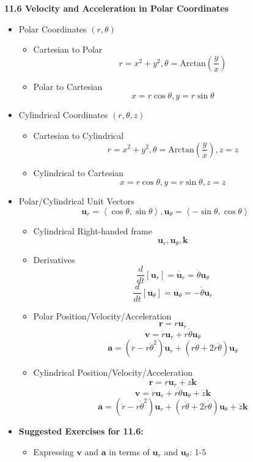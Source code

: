 \documentclass[12pt]{article}
\renewcommand{\vec}[1]{\mathbf{#1}}
\newcommand{\veck}{\mathbf{k}}
\newcommand{\<}{\left<}
\renewcommand{\>}{\right>}
\newcommand{\Arctan}{\text{Arctan}}
\begin{document}
  \newpage
  
  \centerline{\bf 11.6 Velocity and Acceleration in Polar Coordinates}
  
    \begin{itemize}
    
      \item Polar Coordinates $(r,\theta)$
        \begin{itemize}
          \item Cartesian to Polar
            \[r = x^2+y^2, \theta = \Arctan\left(\frac{y}{x}\right)\]
          \item Polar to Cartesian
            \[x = r\cos\theta, y=r\sin\theta\]
        \end{itemize}
        
      \item Cylindrical Coordinates $(r,\theta,z)$
        \begin{itemize}
          \item Cartesian to Cylindrical
            \[r = x^2+y^2, \theta = \Arctan\left(\frac{y}{x}\right), z=z\]
          \item Cylindrical to Cartesian
            \[x = r\cos\theta, y=r\sin\theta, z=z\]
        \end{itemize}
        
      \item Polar/Cylindrical Unit Vectors
        \[\vec{u}_r = \<\cos\theta,\sin\theta\>, \vec{u}_\theta = \<-\sin\theta,\cos\theta\>\]
        \begin{itemize}
          \item Cylindrical Right-handed frame
            \[\vec{u}_r,\vec{u}_\theta,\veck\]
          \item Derivatives
            \[\frac{d}{dt}\left[\vec{u}_r\right] = \dot{\vec{u}_r} = \dot{\theta}\vec{u}_\theta \]
            \[\frac{d}{dt}\left[\vec{u}_\theta\right] = \dot{\vec{u}_\theta} = -\dot{\theta}\vec{u}_r \]
          \item Polar Position/Velocity/Acceleration
            \[\vec{r} = r\vec{u}_r\]
            \[\vec{v} = \dot{r}\vec{u}_r + r\dot\theta\vec{u}_\theta\]
            \[\vec{a} = (\ddot{r} - r\dot\theta^2)\vec{u}_r + (r\ddot\theta + 2\dot{r}\dot\theta)\vec{u}_\theta\]
          \item Cylindrical Position/Velocity/Acceleration
            \[\vec{r} = r\vec{u}_r + z\veck\]
            \[\vec{v} = \dot{r}\vec{u}_r + r\dot\theta\vec{u}_\theta + \dot{z}\veck\]
            \[\vec{a} = (\ddot{r} - r\dot\theta^2)\vec{u}_r + (r\ddot\theta + 2\dot{r}\dot\theta)\vec{u}_\theta+\ddot{z}\veck\]
        \end{itemize}
      
      \item \textbf{ Suggested Exercises for 11.6:}
        \begin{itemize}
        \item Expressing $\vec{v}$ and $\vec{a}$ in terms of $\vec{u}_r$ and $\vec{u}_\theta$: 1-5
        \end{itemize}
    \end{itemize}
  
\end{document}
